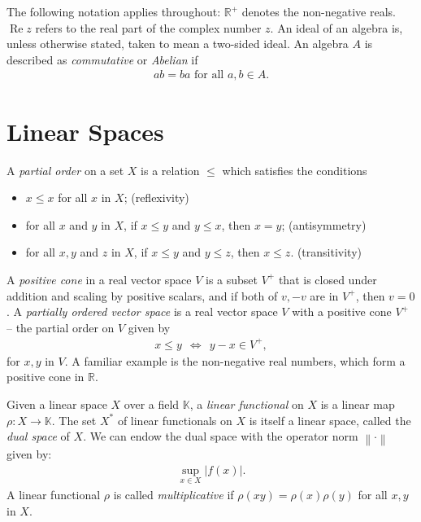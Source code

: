 \documentclass[11pt,a4paper]{report}
\theoremstyle{plain}
\theoremstyle{definition}
\newcommand{\1}{\mathbbm{1}}
\newcommand{\R}{\mathbb{R}}
\DeclareMathOperator{\Real}{\operatorname{Re}}
\begin{document}
	
The following notation applies throughout: $\R^+$ denotes the non-negative 
reals. $\Real z$ refers to the real part of the complex number $z$. An ideal of 
an algebra is, unless otherwise stated, taken to mean a two-sided ideal. An 
algebra $A$ is described as \emph{commutative} or \emph{Abelian} if
\begin{align*}
	ab = ba \mbox{ for all } a,b\in A.
\end{align*}

\section{Linear Spaces}\label{section:linear}

A \emph{partial order} on a set $X$ is a relation $\leq$ which satisfies the 
conditions
\begin{itemize}
	\item $x \leq x$ for all $x$ in $X$; 		\hfill (reflexivity)
	\item for all $x$ and $y$ in $X$, if $x \leq y$ and $y\leq x$, then $x=y$; 
												\hfill (antisymmetry)
	\item for all $x,y$ and $z$ in $X$, if $x \leq y$ and $y\leq z$, then $x\leq z$. 
												\hfill (transitivity)
\end{itemize}

A \emph{positive cone} in a real vector space $V$ is a subset $V^+$ that is 
closed under addition and scaling by positive scalars, and if both of $v,-v$ are in 
$V^+$, then $v=0$. A \emph{partially ordered vector space} is a real vector 
space $V$ with a positive cone $V^+$ -- the partial order on $V$ given by
\begin{align*}
	x\leq y ~~\iff~~ y-x \in V^+,
\end{align*}
for $x,y$ in $V$.
A familiar example is the non-negative real numbers, which form a positive cone in $\R$.


Given a linear space $X$ over a field $\mathbb K$, a \emph{linear functional} on 
$X$ is a linear map $\rho:X\to\mathbb K$. The set $X^\ast$ of linear functionals 
on $X$ is itself a linear space, called the \emph{dual space} of $X$. We can 
endow the dual space with the operator norm $\left\|\cdot\right\|$ given by:
\begin{align*}
	\sup_{x\in X} \left|f(x)\right|.
\end{align*}
A linear functional $\rho$ is called \emph{multiplicative} if $\rho(xy) = 
\rho(x)\rho(y)$ for all $x,y$ in $X$. 
\end{document}
